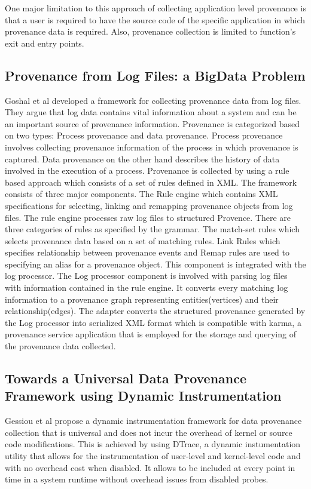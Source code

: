 One major limitation to this approach of collecting application level provenance is that a user is required to have the source code of the specific application in which provenance data is required. Also, provenance collection is limited to function's exit and entry points.


\subsection{Provenance from Log Files: a BigData Problem}


Goshal et al \cite{ghoshal_provenance_2013} developed a framework for collecting provenance data from log files. They argue that log data contains vital information about a system and can be an important source of provenance information. Provenance is categorized based on two types: Process provenance and data provenance. Process provenance involves collecting provenance information of the process in which provenance is captured. Data provenance on the other hand describes the history of data involved in the execution of a process. Provenance is collected by using a rule based approach which consists of a set of rules defined in XML. The framework consists of three major components. The Rule engine which contains XML specifications for selecting, linking and remapping provenance objects from log files. The rule engine processes raw log files to structured Provence. There are three categories of rules as specified by the grammar. The match-set rules which selects provenance data based on a set of matching rules. Link Rules which specifies relationship between provenance events and Remap rules are used to specifying an alias for a provenance object. This component is integrated with the log processor. The Log processor component is involved with parsing log files with information contained in the rule engine. It converts every matching log information to a provenance graph representing entities(vertices) and their relationship(edges). The adapter converts the structured provenance generated by the Log processor into serialized XML format which is compatible with karma, a provenance service application that is employed for the storage and querying of the provenance data collected.




\subsection{Towards a Universal Data Provenance Framework using Dynamic Instrumentation}
Gessiou et al \cite{gessiou_towards_2012} propose a dynamic instrumentation framework for data provenance collection that is universal and does not incur the overhead of kernel or source code modifications. This is achieved by using DTrace, a dynamic instumentation utility that allows for the instrumentation of user-level and kernel-level code and with no overhead cost when disabled. It allows to be included at every point in time in a system  runtime without overhead issues from disabled probes.

